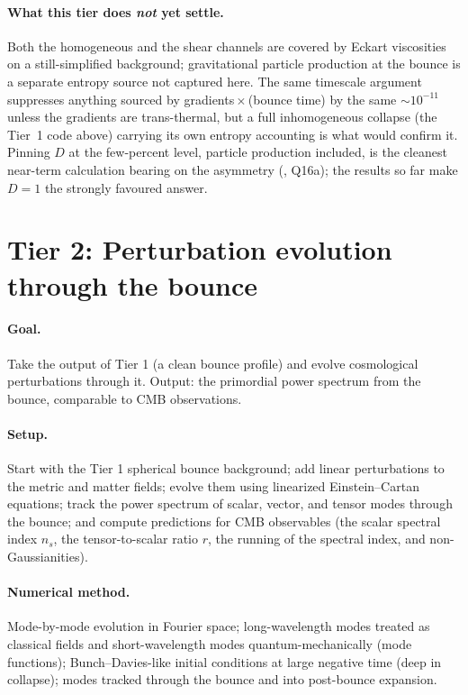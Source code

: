 \paragraph{What this tier does \emph{not} yet settle.} Both the homogeneous and
the shear channels are covered by Eckart viscosities on a still-simplified
background; gravitational particle production at the bounce is a separate entropy
source not captured here. The same timescale argument suppresses anything sourced
by gradients\,$\times$\,(bounce time) by the same $\sim10^{-11}$ unless the
gradients are trans-thermal, but a full inhomogeneous collapse (the Tier~1 code
above) carrying its own entropy accounting is what would confirm it. Pinning $D$
at the few-percent level, particle production included, is the cleanest near-term
calculation bearing on the asymmetry (, Q16a); the
results so far make $D=1$ the strongly favoured answer.

\section{Tier 2: Perturbation evolution through the bounce}

\paragraph{Goal.} Take the output of Tier 1 (a clean bounce profile) and evolve
cosmological perturbations through it. Output: the primordial power spectrum from
the bounce, comparable to CMB observations.

\paragraph{Setup.} Start with the Tier 1 spherical bounce background; add linear
perturbations to the metric and matter fields; evolve them using linearized
Einstein--Cartan equations; track the power spectrum of scalar, vector, and
tensor modes through the bounce; and compute predictions for CMB observables (the
scalar spectral index $n_s$, the tensor-to-scalar ratio $r$, the running of the
spectral index, and non-Gaussianities).

\paragraph{Numerical method.} Mode-by-mode evolution in Fourier space;
long-wavelength modes treated as classical fields and short-wavelength modes
quantum-mechanically (mode functions); Bunch--Davies-like initial conditions at
large negative time (deep in collapse); modes tracked through the bounce and into
post-bounce expansion.

